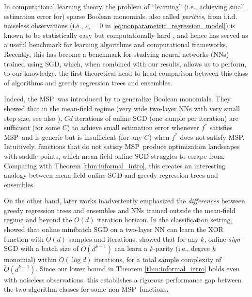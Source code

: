 \documentclass[11pt]{article}
\DeclarePairedDelimiter{\braces}{\lbrace}{\rbrace}
\newcommand{\binspace}{\braces{\pm 1}^\nfeats}
\newcommand{\nfeats}{d}
\newcommand{\MSP}{\textsf{MSP}}
\begin{document}
In computational learning theory, the problem of ``learning'' (i.e., achieving small estimation error for) sparse Boolean monomials, also called \emph{parities}, from i.i.d. noiseless observations (i.e., $\varepsilon_i = 0$ in \eqref{eq:nonparametric_regression_model}) is known to be statistically easy but computationally hard \citep{barak2022hidden}, and hence has served as a useful benchmark for learning algorithms and computational frameworks.
Recently, this has become a benchmark for studying neural networks (NNs) trained using SGD, which, when combined with our results, allows us to perform, to our knowledge, the first theoretical head-to-head comparison between this class of algorithms and greedy regression trees and ensembles.


Indeed, the \textsf{MSP}~was introduced by \cite{abbe2022merged} to generalize Boolean monomials.
They showed that in the mean-field regime (very wide two-layer NNs with very small step size, see also \cite{mei2018mean}), $C\nfeats$ iterations of online SGD (one sample per iteration) are sufficient (for some $C$) to achieve small estimation error whenever $f^*$ satisfies \MSP~and is generic but is insufficient (for any $C$) when $f^*$ does not satisfy \MSP.
Intuitively, functions that do not satisfy \MSP~produce optimization landscapes with saddle points, which mean-field online SGD struggles to escape from.
Comparing with Theorem \ref{thm:informal_intro}, this creates an interesting analogy between mean-field online SGD and greedy regression trees and ensembles.

On the other hand, later works inadvertently emphasized the \emph{differences} between greedy regression trees and ensembles and NNs trained outside the mean-field regime and beyond the $O(\nfeats)$ iteration horizon.
In the classification setting, \cite{Glasgow2024sgd} showed that online minibatch SGD on a two-layer NN can learn the XOR function with $\tilde{\Theta}(\nfeats)$ samples and iterations.
\cite{kou2024matching} showed that for any $k$, online \emph{sign}-SGD with a batch size of $\tilde{O}(\nfeats^{k-1})$ can learn a $k$-parity (i.e., degree $k$ monomial) within $O(\log\nfeats)$ iterations, for a total sample complexity of $\tilde{O}(\nfeats^{k-1})$.
Since our lower bound in Theorem \ref{thm:informal_intro} holds even with noiseless observations, this establishes a rigorous performance gap between the two algorithm classes for some non-\MSP~functions.
\end{document}
